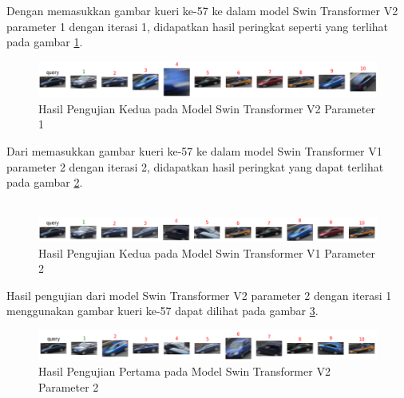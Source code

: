 Dengan memasukkan gambar kueri ke-57 ke dalam model Swin Transformer V2 parameter 1 dengan iterasi 1, didapatkan hasil 
peringkat seperti yang terlihat pada gambar \ref{fig:hasilpengujiankeduapadamodelswintransformerv2param1}.\\

\begin{figure}[h!]
  \centering
  \includegraphics[scale=0.6]{gambar/Que57V2P1IT1.png}
  \caption{Hasil Pengujian Kedua pada Model Swin Transformer V2 Parameter 1}
  \label{fig:hasilpengujiankeduapadamodelswintransformerv2param1}
\end{figure}

Dari memasukkan gambar kueri ke-57 ke dalam model Swin Transformer V1 parameter 2 dengan iterasi 2, didapatkan hasil 
peringkat yang dapat terlihat pada gambar \ref{fig:hasilpengujiankeduapadamodelswintransformerv1param2}.\\
\\

\begin{figure}[h!]
  \centering
  \includegraphics[scale=0.6]{gambar/Que57V1P2IT2.png}
  \caption{Hasil Pengujian Kedua pada Model Swin Transformer V1 Parameter 2}
  \label{fig:hasilpengujiankeduapadamodelswintransformerv1param2}
\end{figure}

Hasil pengujian dari model Swin Transformer V2 parameter 2 dengan iterasi 1 menggunakan gambar kueri ke-57 dapat 
dilihat pada gambar \ref{fig:hasilpengujiankeduapadamodelswintransformerv2param2}.

\begin{figure}[h!]
  \centering
  \includegraphics[scale=0.6]{gambar/Que57V2P2IT1.png}
  \caption{Hasil Pengujian Pertama pada Model Swin Transformer V2 Parameter 2}
  \label{fig:hasilpengujiankeduapadamodelswintransformerv2param2}
\end{figure}

